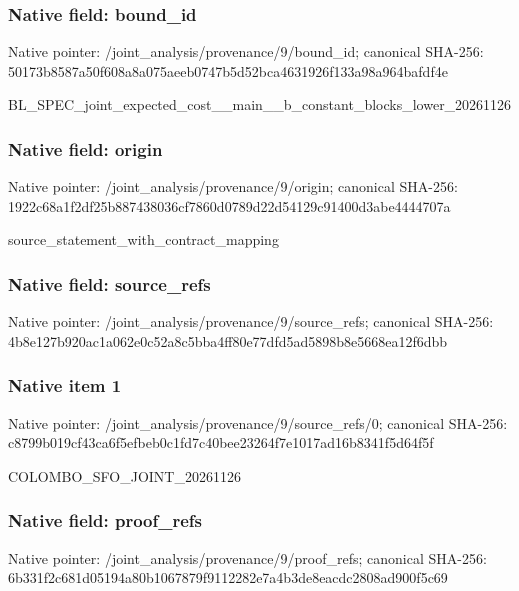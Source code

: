 \documentclass[10pt,a4paper]{article}
\begin{document}
\subsubsection{Native field: bound\_id}


Native pointer: /joint\_analysis/provenance/9/bound\_id; canonical SHA-256: 50173b8587a50f608a8a075a\allowbreak{}eeb0747b5d52bca4631926f1\allowbreak{}33a98a964bafdf4e


BL\_SPEC\_joint\_expected\_c\allowbreak{}ost\_\_main\_\_b\_constant\_bl\allowbreak{}ocks\_lower\_20261126


\subsubsection{Native field: origin}


Native pointer: /joint\_analysis/provenance/9/origin; canonical SHA-256: 1922c68a1f2df25b88743803\allowbreak{}6cf7860d0789d22d54129c91\allowbreak{}400d3abe4444707a


source\_statement\_with\_contract\_mapping


\subsubsection{Native field: source\_refs}


Native pointer: /joint\_analysis/provenan\allowbreak{}ce/9/source\_refs; canonical SHA-256: 4b8e127b920ac1a062e0c52a\allowbreak{}8c5bba4ff80e77dfd5ad5898\allowbreak{}b8e5668ea12f6dbb



\subsubsection{Native item 1}


Native pointer: /joint\_analysis/provenan\allowbreak{}ce/9/source\_refs/0; canonical SHA-256: c8799b019cf43ca6f5efbeb0\allowbreak{}c1fd7c40bee23264f7e1017a\allowbreak{}d16b8341f5d64f5f


COLOMBO\_SFO\_JOINT\_20261126


\subsubsection{Native field: proof\_refs}


Native pointer: /joint\_analysis/provenance/9/proof\_refs; canonical SHA-256: 6b331f2c681d05194a80b106\allowbreak{}7879f9112282e7a4b3de8eac\allowbreak{}dc2808ad900f5c69
\end{document}
